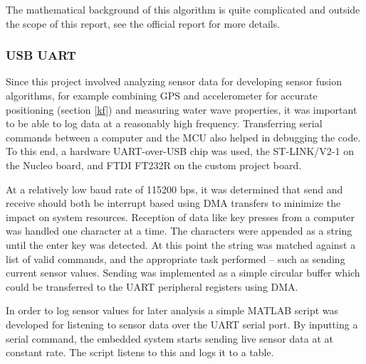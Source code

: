 The mathematical background of this algorithm is quite complicated and outside the scope of this report, see the official report \cite{madgwick-report} for more details.


\subsubsection{USB UART}
\label{usb-uart}
Since this project involved analyzing sensor data for developing sensor fusion algorithms, for example combining GPS and accelerometer for accurate positioning (section \ref{kf}) and measuring water wave properties, it was important to be able to log data at a reasonably high frequency. Transferring serial commands between a computer and the MCU also helped in debugging the code. To this end, a hardware UART-over-USB chip was used, the ST-LINK/V2-1 on the Nucleo board, and FTDI FT232R on the custom project board.

At a relatively low baud rate of 115200 bps, it was determined that send and receive should both be interrupt based using DMA transfers to minimize the impact on system resources. Reception of data like key presses from a computer was handled one character at a time. The characters were appended as a string until the enter key was detected. At this point the string was matched against a list of valid commands, and the appropriate task performed -- such as sending current sensor values. Sending was implemented as a simple circular buffer which could be transferred to the UART peripheral registers using DMA.

In order to log sensor values for later analysis a simple MATLAB script was developed for listening to sensor data over the UART serial port. By inputting a serial command, the embedded system starts sending live sensor data at at constant rate. The script listens to this and logs it to a table.


